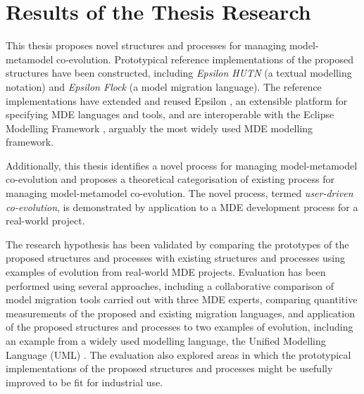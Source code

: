 
\section{Results of the Thesis Research}
\label{sec:research_results}

This thesis proposes novel structures and processes for managing model-met\-amo\-del co-evolution. Prototypical reference implementations of the proposed structures have been constructed, including \emph{Epsilon HUTN} (a textual modelling notation) and \emph{Epsilon Flock} (a model migration language). The reference implementations have extended and reused  Epsilon \cite{kolovos09thesis}, an extensible platform for specifying MDE languages and tools, and are interoperable with the Eclipse Modelling Framework \cite{steinberg09emf}, arguably the most widely used MDE modelling framework.

Additionally, this thesis identifies a novel process for managing model-metamodel co-evolution and proposes a theoretical categorisation of existing process for managing model-metamodel co-evolution. The novel process, termed \emph{user-driven co-evolution}, is demonstrated by application to a MDE development process for a real-world project.

The research hypothesis has been validated by comparing the prototypes of the proposed structures and processes with existing structures and processes using examples of evolution from real-world MDE projects. Evaluation has been performed using several approaches, including a collaborative comparison of model migration tools carried out with three MDE experts, comparing quantitive measurements of the proposed and existing migration languages, and application of the proposed structures and processes to two examples of evolution, including an example from a widely used modelling language, the Unified Modelling Language (UML) \cite{uml212}. The evaluation also explored areas in which the prototypical implementations of the proposed structures and processes might be usefully improved to be fit for industrial use.




